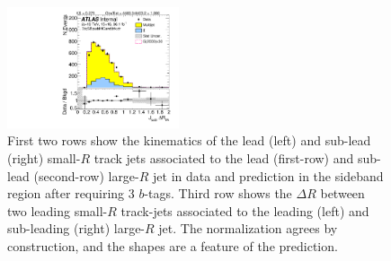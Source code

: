 \begin{figure}[htbp!]
\begin{center}
\includegraphics[width=0.45\textwidth,angle=-90]{figures/boosted/Sideband/b77_ThreeTag_Sideband_sublHCand_trk_dr.pdf}
  \caption{First two rows show the kinematics of the lead (left) and sub-lead (right) small-$R$ track jets associated to the lead (first-row) and sub-lead (second-row) large-$R$ jet in data and prediction in the sideband region after requiring 3 $b$-tags. Third row shows the $\Delta R$ between two leading small-$R$ track-jets associated to the leading (left) and sub-leading (right) large-$R$ jet. The normalization agrees by construction, and the shapes are a feature of the prediction. }
  \label{fig:boosted-3b-sideband-ak2}
\end{center}
\end{figure}


